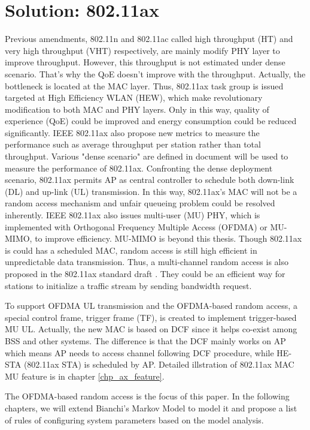 \section{Solution: 802.11ax}
Previous amendments, 802.11n and 802.11ac called high throughput (HT) and very high throughput (VHT) respectively, are mainly modify PHY layer to improve throughput. 
However, this throughput is not estimated under dense scenario. 
That's why the QoE doesn't improve with the throughput.  
Actually, the bottleneck is located at the MAC layer.
Thus, 802.11ax task group is issued targeted at High Efficiency WLAN (HEW)\cite{802.11ax_par}, which make revolutionary modification to both MAC and PHY layers.
Only in this way, quality of experience (QoE) could be improved and energy consumption could be reduced significantly.
IEEE 802.11ax also propose new metrics to measure the performance such as average throughput per station rather than total throughput.
Various "dense scenario" are defined in document \cite{802.11ax_simu} will be used to measure the performance of 802.11ax.
Confronting the dense deployment scenario, 802.11ax permits AP as central controller to schedule both down-link (DL) and up-link (UL) transmission. 
In this way, 802.11ax's MAC will not be a random access mechanism and unfair queueing problem could be resolved inherently.
IEEE 802.11ax also issues multi-user (MU) PHY, which is implemented with Orthogonal Frequency Multiple Access (OFDMA) or MU-MIMO, to improve efficiency.
MU-MIMO is beyond this thesis. 
Though 802.11ax is could has a scheduled MAC, random access is still high efficient in unpredictable data transmission.
Thus, a multi-channel random access is also proposed in the 802.11ax standard draft \cite{draft_ax}. 
They could be an efficient way for stations to initialize a traffic stream by sending bandwidth request.

To support OFDMA UL transmission and the OFDMA-based random access, a special control frame, trigger frame (TF), is created to implement trigger-based MU UL\cite{draft_ax}. 
Actually, the new MAC is based on DCF since it helps co-exist among BSS and other systems. The difference is that the DCF mainly works on AP which means AP needs to access channel following DCF procedure, while HE-STA (802.11ax STA) is scheduled by AP. 
Detailed illstration of 802.11ax MAC MU feature is in chapter \ref{chp_ax_feature}.

The OFDMA-based random access is the focus of this paper. In the following chapters, we will extend Bianchi's Markov Model to model it and propose a list of rules of configuring system parameters based on the model analysis.

